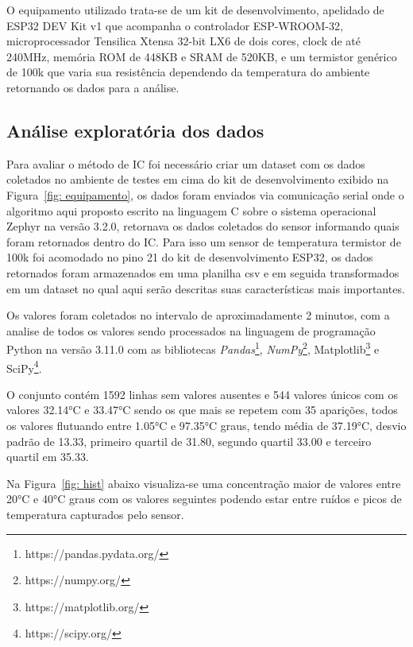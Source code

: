 O equipamento utilizado trata-se de um kit de desenvolvimento, apelidado de ESP32 DEV Kit v1 que acompanha o controlador ESP-WROOM-32, microprocessador Tensilica Xtensa 32-bit LX6 de dois cores, clock de até 240MHz, memória ROM de 448KB e SRAM de 520KB, e um termistor genérico de 100k que varia sua resistência dependendo da temperatura do ambiente retornando os dados para a análise.


\subsection{Análise exploratória dos dados}
Para avaliar o método de IC foi necessário criar um dataset com os dados coletados no ambiente de testes em cima do kit de desenvolvimento exibido na Figura~\ref{fig: equipamento}, os dados foram enviados via comunicação serial onde o algoritmo aqui proposto escrito na linguagem C sobre o sistema operacional Zephyr na versão 3.2.0, retornava os dados coletados do sensor informando quais foram retornados dentro do IC. Para isso um sensor de temperatura termistor de 100k foi acomodado no pino 21 do kit de desenvolvimento ESP32, os dados retornados foram armazenados em uma planilha csv e em seguida transformados em um dataset no qual aqui serão descritas suas características mais importantes.

Os valores foram coletados no intervalo de aproximadamente 2 minutos, com a analise de todos os valores sendo processados na linguagem de programação Python na versão 3.11.0 com as bibliotecas \textit{Pandas}\footnote{https://pandas.pydata.org/}, \textit{NumPy}\footnote{https://numpy.org/}, {Matplotlib}\footnote{https://matplotlib.org/} e {SciPy}\footnote{https://scipy.org/}.   

O conjunto contém 1592 linhas sem valores ausentes e 544 valores únicos com os valores \ang{32.14}C e \ang{33.47}C sendo os que mais se repetem com 35 aparições, todos os valores flutuando entre \ang{1.05}C e \ang{97.35}C graus, tendo média de \ang{37.19}C, desvio padrão de 13.33, primeiro quartil de 31.80, segundo quartil 33.00 e terceiro quartil em 35.33.


Na Figura~\ref{fig: hist} abaixo visualiza-se uma concentração maior de valores entre \ang{20}C e \ang{40}C graus com os valores seguintes podendo estar entre ruídos e picos de temperatura capturados pelo sensor. 

